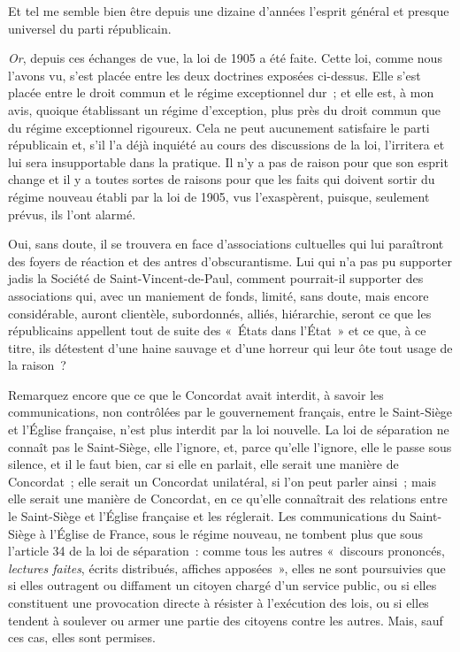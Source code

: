 \documentclass[french,twoside]{book} %
\begin{document}
Et tel me semble bien être depuis une dizaine d’années l’esprit général et presque universel du parti républicain.\par
{\itshape Or}, depuis ces échanges de vue, la loi de 1905 a été faite. Cette loi, comme nous l’avons vu, s’est placée entre les deux doctrines exposées ci-dessus. Elle s’est placée entre le droit commun et le régime exceptionnel dur ; et elle est, à mon avis, quoique établissant un régime d’exception, plus près du droit commun que du régime exceptionnel rigoureux. Cela ne peut aucunement satisfaire le parti républicain et, s’il l’a déjà inquiété au cours des discussions de la loi, l’irritera et lui sera insupportable dans la pratique. Il n’y a pas de raison pour que son esprit change et il y a toutes sortes de raisons pour que les faits qui  doivent sortir du régime nouveau établi par la loi de 1905, vus l’exaspèrent, puisque, seulement prévus, ils l’ont alarmé.\par
Oui, sans doute, il se trouvera en face d’associations cultuelles qui lui paraîtront des foyers de réaction et des antres d’obscurantisme. Lui qui n’a pas pu supporter jadis la Société de Saint-Vincent-de-Paul, comment pourrait-il supporter des associations qui, avec un maniement de fonds, limité, sans doute, mais encore considérable, auront clientèle, subordonnés, alliés, hiérarchie, seront ce que les républicains appellent tout de suite des « États dans l’État » et ce que, à ce titre, ils détestent d’une haine sauvage et d’une horreur qui leur ôte tout usage de la raison ?\par
Remarquez encore que ce que le Concordat avait interdit, à savoir les communications, non contrôlées par le gouvernement français, entre le Saint-Siège et l’Église française, n’est plus interdit par la loi nouvelle. La loi de séparation ne connaît pas le Saint-Siège, elle l’ignore, et, parce qu’elle l’ignore, elle le passe sous silence, et il le faut bien, car si elle en parlait, elle serait une manière de Concordat ; elle serait un Concordat unilatéral, si l’on peut parler ainsi ; mais elle serait une manière de Concordat, en ce qu’elle connaîtrait des relations entre le Saint-Siège et l’Église française  et les réglerait. Les communications du Saint-Siège à l’Église de France, sous le régime nouveau, ne tombent plus que sous l’article 34 de la loi de séparation : comme tous les autres « discours prononcés, {\itshape lectures faites}, écrits distribués, affiches apposées », elles ne sont poursuivies que si elles outragent ou diffament un citoyen chargé d’un service public, ou si elles constituent une provocation directe à résister à l’exécution des lois, ou si elles tendent à soulever ou armer une partie des citoyens contre les autres. Mais, sauf ces cas, elles sont permises.\par
\end{document}
